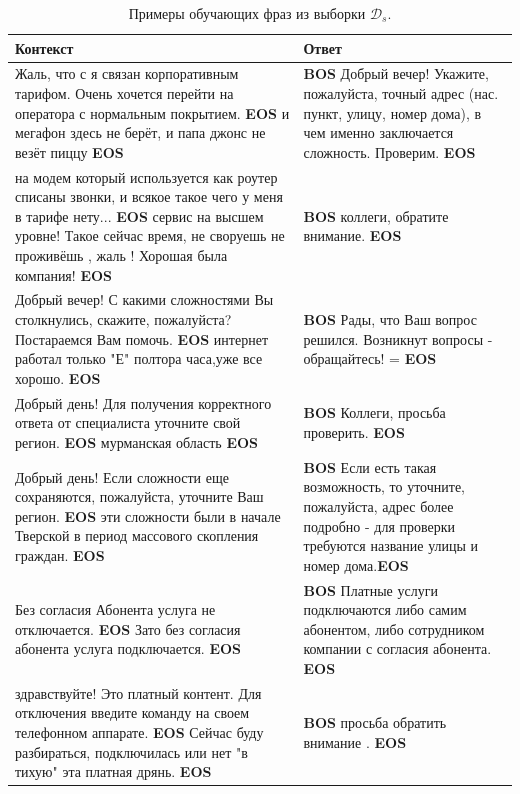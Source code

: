 \documentclass[12pt,a4paper]{amsart}
\begin{document}
\begin{center}
	\begin{table}[!hbtp]
		\caption{Примеры обучающих фраз из выборки $ \mathcal{D}_s $.}
		\label{table:belikex-twitter-support}
		\begin{tabulary}{\textwidth}{|L|L|}
			\hline
			Контекст & Ответ \\
			\hline \hline
			Жаль, что с я связан корпоративным тарифом. Очень хочется перейти на оператора с нормальным покрытием. \textbf{EOS} и мегафон здесь не берёт, и папа джонс не везёт пиццу \textbf{EOS} & \textbf{BOS} Добрый вечер! Укажите, пожалуйста, точный адрес (нас. пункт, улицу, номер дома), в чем именно заключается сложность. Проверим. \textbf{EOS} \\
			\hline
			на модем который используется как роутер списаны звонки, и всякое такое чего у меня в тарифе нету... \textbf{EOS} сервис на высшем уровне! Такое сейчас время, не своруешь не проживёшь , жаль ! Хорошая была компания! \textbf{EOS} & \textbf{BOS} коллеги, обратите внимание. \textbf{EOS} \\
			\hline
			Добрый вечер! С какими сложностями Вы столкнулись, скажите, пожалуйста? Постараемся Вам помочь. \textbf{EOS} интернет работал только "Е" полтора часа,уже все хорошо. \textbf{EOS} & \textbf{BOS} Рады, что Ваш вопрос решился. Возникнут вопросы - обращайтесь! =\text{)} \textbf{EOS} \\
			\hline 
			Добрый день! Для получения корректного ответа от специалиста уточните свой регион. \textbf{EOS} мурманская область \textbf{EOS} & \textbf{BOS} Коллеги, просьба проверить. \textbf{EOS} \\
			\hline
			Добрый день! Если сложности еще сохраняются, пожалуйста, уточните Ваш регион. \textbf{EOS} эти сложности были в начале Тверской в период массового скопления граждан. \textbf{EOS} & \textbf{BOS} Если есть такая возможность, то уточните, пожалуйста, адрес более подробно - для проверки требуются название улицы и номер дома.\textbf{EOS} \\
			\hline
			Без согласия Абонента услуга не отключается. \textbf{EOS} Зато без согласия абонента услуга подключается. \textbf{EOS} & \textbf{BOS} Платные услуги подключаются либо самим абонентом, либо сотрудником компании с согласия абонента. \textbf{EOS} \\
			\hline 
			здравствуйте! Это платный контент. Для отключения введите команду на своем телефонном аппарате. \textbf{EOS} Сейчас буду разбираться, подключилась или нет "в тихую" эта платная дрянь. \textbf{EOS} & \textbf{BOS} просьба обратить внимание . \textbf{EOS} \\

\end{tabulary}
\end{table}
\end{center}
\end{document}
